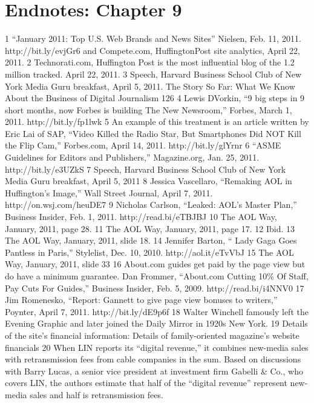 \section{Endnotes: Chapter 9}
1 ``January 2011: Top U.S. Web Brands and News Sites'' Nielsen, Feb. 11, 2011.
http://bit.ly/evjGr6 and Compete.com, HuffingtonPost site analytics, April 22, 2011.
2 Technorati.com, Huffington Post is the most influential blog of the 1.2 million tracked.
April 22, 2011.
3 Speech, Harvard Business School Club of New York Media Guru breakfast, April 5, 2011.
The Story So Far: What We Know About the Business of Digital Journalism
126
4 Lewis DVorkin, ``9 big steps in 9 short months, now Forbes is building The New Newsroom,''
Forbes, March 1, 2011. http://bit.ly/fp1lwk
5 An example of this treatment is an article written by Eric Lai of SAP, ``Video Killed the
Radio Star, But Smartphones Did NOT Kill the Flip Cam,'' Forbes.com, April 14, 2011.
http://bit.ly/glYrnr
6 ``ASME Guidelines for Editors and Publishers,'' Magazine.org, Jan. 25, 2011.
http://bit.ly/e3UZkS
7 Speech, Harvard Business School Club of New York Media Guru breakfast, April 5, 2011
8 Jessica Vascellaro, ``Remaking AOL in Huffington’s Image,'' Wall Street Journal, April 7, 2011.
http://on.wsj.com/heuDE7
9 Nicholas Carlson, ``Leaked: AOL’s Master Plan,'' Business Insider, Feb. 1, 2011.
http://read.bi/eTBJBJ
10 The AOL Way, January, 2011, page 28.
11 The AOL Way, January, 2011, page 17.
12 Ibid.
13 The AOL Way, January, 2011, slide 18.
14 Jennifer Barton, `` Lady Gaga Goes Pantless in Paris,'' Stylelist, Dec. 10, 2010.
http://aol.it/eTvVbJ
15 The AOL Way, January, 2011, slide 33
16 About.com guides get paid by the page view but do have a minimum guarantee. Dan Frommer,
``About.com Cutting 10\% Of Staff, Pay Cuts For Guides,'' Business Insider, Feb. 5, 2009.
http://read.bi/i4NNV0
17 Jim Romenesko, ``Report: Gannett to give page view bonuses to writers,'' Poynter,
April 7, 2011. http://bit.ly/dE9p6f
18 Walter Winchell famously left the Evening Graphic and later joined the Daily Mirror in 1920s
New York.
19 Details of the site’s financial information:
Details of family-oriented magazine’s website financials
20 When LIN reports its ``digital revenue,'' it combines new-media sales with retransmission fees
from cable companies in the sum. Based on discussions with Barry Lucas, a senior vice president
at investment firm Gabelli & Co., who covers LIN, the authors estimate that half of the
``digital revenue'' represent new-media sales and half is retransmission fees.
